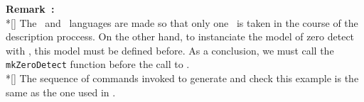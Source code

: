      \begin{minipage}[t]{\textwidth}
       {\bf Remark~:}\\*[\bigskipamount]
       \forceindent
         The \fpgen\ and \genlib\ languages are made so that only one
       \netlist\ is taken in the course of the description proccess. On the
       other hand, to instanciate the model of zero detect with \DPIMPORT,
       this model must be defined before. As a conclusion, we must call
       the {\tt mkZeroDetect} function before the call to \DPDEFLOFIG.
       \\*[\bigskipamount]
       \forceindent
         The sequence of commands invoked to generate and check this
       example is the same as the one used in \sampledpt.
     \end{minipage}
